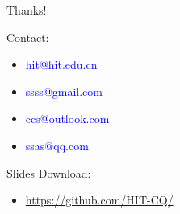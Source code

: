 \begin{frame}
	
	\begin{flushleft}
		{\huge Thanks!}
	\end{flushleft}
	
	\vspace{40pt}
	
	Contact:  
		\begin{itemize}
				\item \textcolor{blue}{hit@hit.edu.cn}
				\item \textcolor{blue}{ssss@gmail.com}
				\item \textcolor{blue}{ccs@outlook.com}
				\item \textcolor{blue}{ssas@qq.com}
		\end{itemize}
	Slides Download: 
		\begin{itemize}
				\item \textcolor{blue}{\url{https://github.com/HIT-CQ/}}
		\end{itemize}

\end{frame}